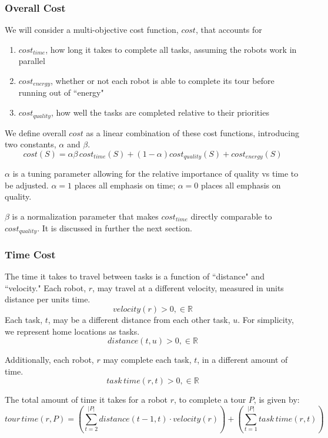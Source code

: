 \documentclass[a4paper]{article}
\begin{document}
\subsubsection{Overall Cost}

We will consider a multi-objective cost function, $\mathit{cost}$, that accounts for
\begin{enumerate}
\item $\mathit{cost}_\mathit{time}$, how long it takes to complete all tasks, assuming the robots work in parallel
\item $\mathit{cost}_\mathit{energy}$, whether or not each robot is able to complete its tour before running out of ``energy"
\item $\mathit{cost}_\mathit{quality}$, how well the tasks are completed relative to their priorities
\end{enumerate}

We define overall $\mathit{cost}$ as a linear combination of these cost functions, introducing two constants, $\alpha$ and $\beta$.
$$
\mathit{cost}(S) =
  \alpha \beta \, \mathit{cost}_\mathit{time}(S) +
  (1-\alpha) \mathit{cost}_\mathit{quality}(S) +
  \mathit{cost}_\mathit{energy}(S)
$$

$\alpha$ is a tuning parameter allowing for the relative importance of quality vs time to be adjusted. $\alpha = 1$ places all emphasis on time; $\alpha = 0$ places all emphasis on quality.

$\beta$ is a normalization parameter that makes $\mathit{cost}_\mathit{time}$ directly comparable to $\mathit{cost}_\mathit{quality}$. It is discussed in further the next section.

\subsubsection{Time Cost}

The time it takes to travel between tasks is a function of ``distance" and ``velocity." Each robot, $r$, may travel at a different velocity, measured in units distance per units time.
$$\mathit{velocity}(r) > 0, \in \mathbb{R}$$
Each task, $t$, may be a different distance from each other task, $u$. For simplicity, we represent home locations as tasks.
$$\mathit{distance}(t, u) > 0, \in \mathbb{R}$$

Additionally, each robot, $r$ may complete each task, $t$, in a different amount of time.
$$\mathit{task \, time}(r, t) > 0, \in \mathbb{R}$$

The total amount of time it takes for a robot $r$, to complete a tour $P$, is given by:
$$
\mathit{tour \, time}(r, P) =
  \left(
    \sum^{|P|}_{t=2} \mathit{distance}(t - 1, t) \cdot \mathit{velocity}(r)
  \right) +
  \left(
    \sum^{|P|}_{t=1} \mathit{task \, time}(r, t)
  \right)
$$
\end{document}
